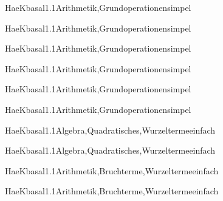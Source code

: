 \documentclass[12pt]{article}
\begin{document}
\begin{Add}{HaeK}{basal1.1}{Arithmetik,Grundoperationen}{simpel}
\solution{ }
\end{Add}
\begin{Add}{HaeK}{basal1.1}{Arithmetik,Grundoperationen}{simpel}
\end{Add}

\begin{Add}{HaeK}{basal1.1}{Arithmetik,Grundoperationen}{simpel}
\solution{ }
\end{Add}
\begin{Add}{HaeK}{basal1.1}{Arithmetik,Grundoperationen}{simpel}
\end{Add}

\begin{Add}{HaeK}{basal1.1}{Arithmetik,Grundoperationen}{simpel}
\solution{ }
\end{Add}
\begin{Add}{HaeK}{basal1.1}{Arithmetik,Grundoperationen}{simpel}
\end{Add}

\begin{Add}{HaeK}{basal1.1}{Algebra,Quadratisches,Wurzelterme}{einfach}
\solution{ }
\end{Add}
\begin{Add}{HaeK}{basal1.1}{Algebra,Quadratisches,Wurzelterme}{einfach}
\end{Add}

\begin{Add}{HaeK}{basal1.1}{Arithmetik,Bruchterme,Wurzelterme}{einfach}
\solution{ }
\end{Add}
\begin{Add}{HaeK}{basal1.1}{Arithmetik,Bruchterme,Wurzelterme}{einfach}
\end{Add}
\end{document}
